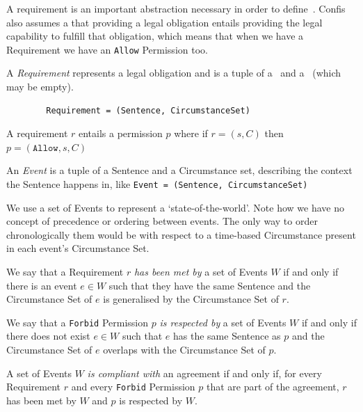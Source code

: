 A requirement is an important abstraction necessary in order to define~.
Confis also assumes a that providing a legal obligation entails providing the legal capability to fulfill that obligation, which means that when we have a Requirement we have an \texttt{Allow} Permission too.

\begin{definition}[Requirement]
    \label{def:requirement} A \emph{Requirement} represents a legal obligation and is a tuple of a~ and a~ (which may be empty).
    \begin{verbatim}
        Requirement = (Sentence, CircumstanceSet)
    \end{verbatim}

    A requirement $r$ entails a permission $p$ where if $r = (s, C)$ then $p = (\texttt{Allow}, s, C)$
\end{definition}

\begin{definition}[Event]
    \label{def:event}
    An \emph{Event} is a tuple of a Sentence and a Circumstance set, describing the context the Sentence happens in, like \texttt{Event = (Sentence, CircumstanceSet)}
\end{definition}

We use a set of Events to represent a `state-of-the-world'.
Note how we have no concept of precedence or ordering between events.
The only way to order chronologically them would be with respect to a time-based Circumstance present in each event's Circumstance Set.

\begin{definition}[Compliance]
    \label{def:confis-compliance}
    We say that a Requirement $r$ \emph{has been met by} a set of Events $W$ if and only if there is an event $e \in W$ such that they have the same Sentence and the Circumstance Set of $e$ is generalised by the Circumstance Set of $r$.

    We say that a \texttt{Forbid} Permission $p$ \emph{is respected by} a set of Events $W$ if and only if there does not exist $e \in W$ such that $e$ has the same Sentence as $p$ and the Circumstance Set of $e$ overlaps with the Circumstance Set of $p$.

    A set of Events $W$ \emph{is compliant with} an agreement if and only if, for every Requirement $r$ and every \texttt{Forbid} Permission $p$ that are part of the agreement, $r$ has been met by $W$ and $p$ is respected by $W$.
\end{definition}

